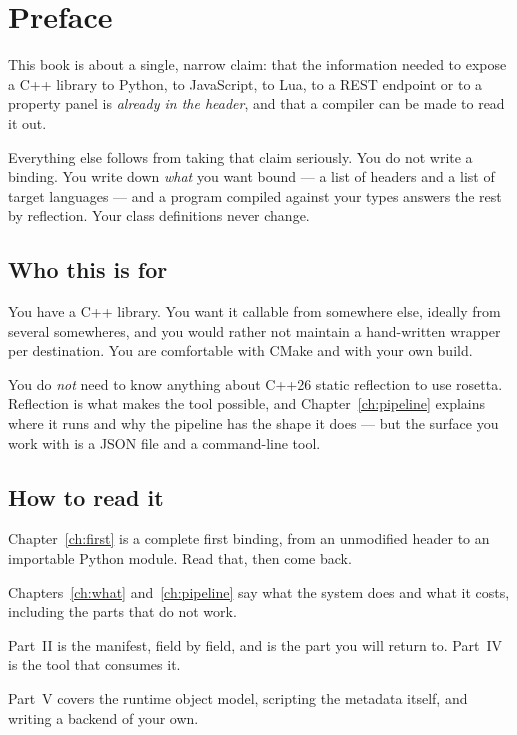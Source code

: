 \chapter*{Preface}

This book is about a single, narrow claim: that the information needed to
expose a C++ library to Python, to JavaScript, to Lua, to a REST endpoint or
to a property panel is \emph{already in the header}, and that a compiler can
be made to read it out.

Everything else follows from taking that claim seriously. You do not write a
binding. You write down \emph{what} you want bound --- a list of headers and a
list of target languages --- and a program compiled against your types answers
the rest by reflection. Your class definitions never change.

\section*{Who this is for}

You have a C++ library. You want it callable from somewhere else, ideally from
several somewheres, and you would rather not maintain a hand-written wrapper
per destination. You are comfortable with CMake and with your own build.

You do \emph{not} need to know anything about C++26 static reflection to use
rosetta. Reflection is what makes the tool possible, and Chapter~\ref{ch:pipeline}
explains where it runs and why the pipeline has the shape it does --- but the
surface you work with is a JSON file and a command-line tool.

\section*{How to read it}

\begin{description}[leftmargin=1.4cm,style=nextline,font=\normalfont\itshape]
  \item[In a hurry] Chapter~\ref{ch:first} is a complete first binding, from an
    unmodified header to an importable Python module. Read that, then come back.
  \item[Evaluating rosetta] Chapters~\ref{ch:what} and~\ref{ch:pipeline} say what
    the system does and what it costs, including the parts that do not work.
  \item[Using it in earnest] Part~II is the manifest, field by field, and is the
    part you will return to. Part~IV is the tool that consumes it.
  \item[Pushing past bindings] Part~V covers the runtime object model, scripting
    the metadata itself, and writing a backend of your own.
\end{description}

